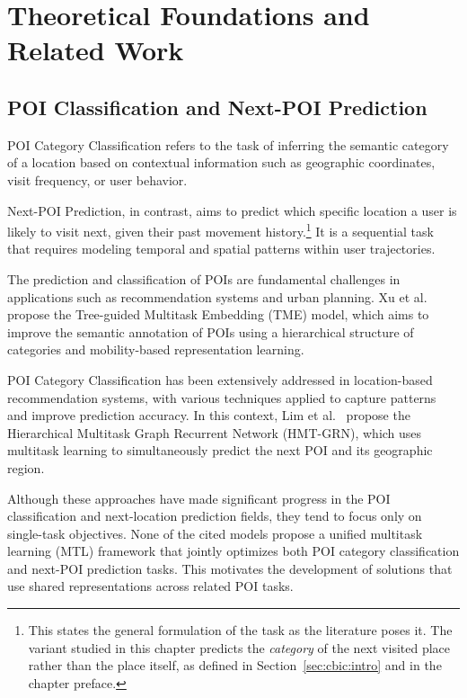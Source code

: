 \section{Theoretical Foundations and Related Work}
\label{sec:cbic:related}

\subsection{POI Classification and Next-POI Prediction}
POI Category Classification refers to the task of inferring the semantic category of a location based on contextual information such as geographic coordinates, visit frequency, or user behavior.

Next-POI Prediction, in contrast, aims to predict which specific location a user is likely to visit next, given their past movement history.\footnote{This states the general formulation of the task as the literature poses it. The variant studied in this chapter predicts the \emph{category} of the next visited place rather than the place itself, as defined in Section~\ref{sec:cbic:intro} and in the chapter preface.} It is a sequential task that requires modeling temporal and spatial patterns within user trajectories.

The prediction and classification of POIs are fundamental challenges in applications such as recommendation systems and urban planning. Xu et al.~\cite{Xu2023} propose the Tree-guided Multitask Embedding (TME) model, which aims to improve the semantic annotation of POIs using a hierarchical structure of categories and mobility-based representation learning.

POI Category Classification has been extensively addressed in location-based recommendation systems, with various techniques applied to capture patterns and improve prediction accuracy. In this context, Lim et al.~\cite{Lim2022} propose the Hierarchical Multitask Graph Recurrent Network (HMT-GRN), which uses multitask learning to simultaneously predict the next POI and its geographic region.

Although these approaches have made significant progress in the POI classification and next-location prediction fields, they tend to focus only on single-task objectives. None of the cited models propose a unified multitask learning (MTL) framework that jointly optimizes both POI category classification and next-POI prediction tasks. This motivates the development of solutions that use shared representations across related POI tasks.


